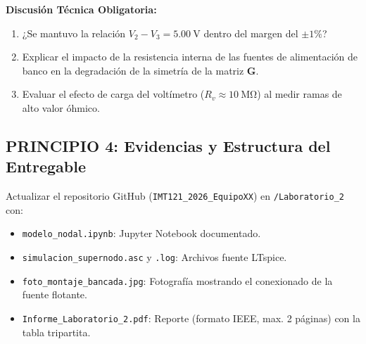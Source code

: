 \documentclass[11pt, a4paper]{article}
\begin{document}
\begin{table}[H]
    \centering
\end{table}

\textbf{Discusión Técnica Obligatoria:}
\begin{enumerate}[itemsep=1pt]
    \item ¿Se mantuvo la relación $V_2 - V_3 = \qty{5.00}{\volt}$ dentro del margen del $\pm 1\%$?
    \item Explicar el impacto de la resistencia interna de las fuentes de alimentación de banco en la degradación de la simetría de la matriz $\mathbf{G}$.
    \item Evaluar el efecto de carga del voltímetro ($R_v \approx \qty{10}{\mega\ohm}$) al medir ramas de alto valor óhmico.
\end{enumerate}

\subsection*{PRINCIPIO 4: Evidencias y Estructura del Entregable}
Actualizar el repositorio GitHub (\texttt{IMT121\_2026\_EquipoXX}) en \texttt{/Laboratorio\_2} con:
\begin{itemize}[itemsep=1pt]
    \item \texttt{modelo\_nodal.ipynb}: Jupyter Notebook documentado.
    \item \texttt{simulacion\_supernodo.asc} y \texttt{.log}: Archivos fuente LTspice.
    \item \texttt{foto\_montaje\_bancada.jpg}: Fotografía mostrando el conexionado de la fuente flotante.
    \item \texttt{Informe\_Laboratorio\_2.pdf}: Reporte (formato IEEE, max. 2 páginas) con la tabla tripartita.
\end{itemize}
\end{document}
